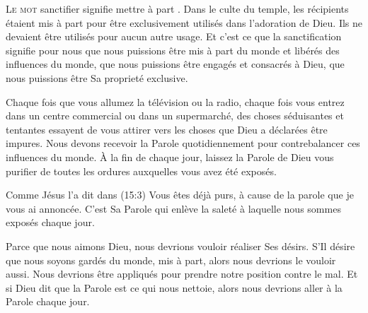 \dvrule







\lettrine{L}{e mot} \Og sanctifier \Fg{} signifie \Og mettre à part \Fg{}.
 Dans le culte du temple, les récipients étaient mis à part pour être
 exclusivement utilisés dans l'adoration de Dieu.
 Ils ne devaient être utilisés pour aucun autre usage.
 Et c'est ce que la sanctification signifie pour nous
 \ocadr que nous puissions être mis à part du monde et libérés
 des influences du monde, que nous puissions être engagés et consacrés à Dieu,
 que nous puissions être Sa proprieté exclusive.


Chaque fois que vous allumez la télévision ou la radio,
 chaque fois vous entrez dans un centre commercial ou dans un supermarché,
 des choses séduisantes et tentantes essayent de vous attirer
 vers les choses que Dieu a déclarées être impures.
 Nous devons recevoir la Parole quotidiennement pour contrebalancer
 ces influences du monde. À la fin de chaque jour,
 laissez la Parole de Dieu vous purifier de toutes les ordures
 auxquelles vous avez été exposés.

Comme Jésus l'a dit dans (15:3)\frcolon{} 
 \Og Vous êtes déjà purs, à cause de la parole que je vous ai annoncée. \Fg{}
 C'est Sa Parole qui enlève la saleté à laquelle nous sommes exposés chaque jour.

Parce que nous aimons Dieu, nous devrions vouloir réaliser Ses désirs.
 S'Il désire que nous soyons gardés du monde, mis à part,
 alors nous devrions le vouloir aussi. Nous devrions être appliqués
 pour prendre notre position contre le mal.
 Et si Dieu dit que la Parole est ce qui nous nettoie,
 alors nous devrions aller à la Parole chaque jour.

